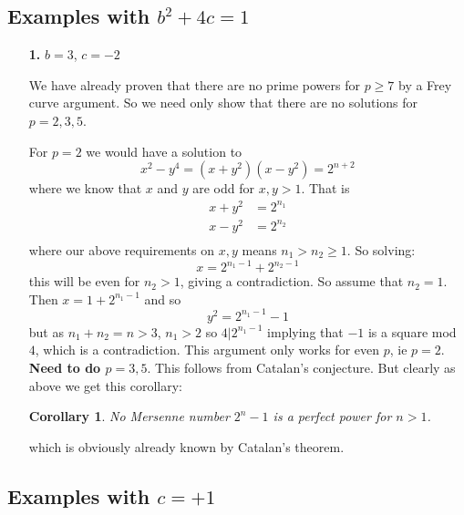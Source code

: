 \documentclass[12pt]{article}
\newtheorem{cor}[thm]{Corollary}
\begin{document}
\subsection{Examples with $b^2+4c = 1$}

\begin{enumerate}

\item[\textbf{1.}] $b = 3$, $c = -2$

We have already proven that there are no prime powers for $p \geq 7$ by a Frey curve argument.  So we need only show that there are no solutions for $p = 2,3,5$.

For $p=2$ we would have a solution to
\[ x^2-y^{4} = (x+y^2)(x-y^2)= 2^{n+2} \]
where we know that $x$ and $y$ are odd for $x,y >1$.  That is
\begin{align*}
x+y^2 & = 2^{n_1} \\
x-y^2 & = 2^{n_2} \\ 
\end{align*}
where our above requirements on $x,y$ means $n_1 > n_2  \geq 1$.  So solving:
\[ x = 2^{n_1-1} +2^{n_2-1} \]
this will be even for $n_2 >1$, giving a contradiction.  So assume that $n_2 = 1$.  Then $x = 1+2^{n_1-1}$ and so 
\[ y^2 = 2^{n_1-1} - 1 \]
but as $n_1+n_2 = n >3$, $n_1 > 2$ so $4|2^{n_1-1}$ implying that $-1$ is a square mod $4$, which is a contradiction.   This argument only works for even $p$, ie $p = 2$.  \textbf{Need to do $p=3,5$}.  This follows from Catalan's conjecture.  But clearly as above we get this corollary:

\begin{cor}
No Mersenne number $2^n-1$ is a perfect power for $n>1$.
\end{cor}

which is obviously already known by Catalan's theorem.
 
 \end{enumerate}
 
 \subsection{Examples with $c=  +1$}
 
\end{document}
